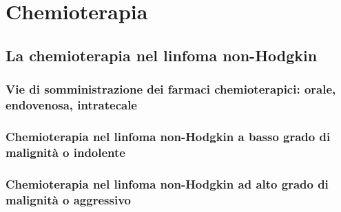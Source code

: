 \chapter{Chemioterapia}

\section{La chemioterapia nel linfoma non-Hodgkin}

\subsection{Vie di somministrazione dei farmaci chemioterapici: orale, endovenosa, intratecale}

\subsection{Chemioterapia nel linfoma non-Hodgkin a basso grado di malignità o indolente}

\subsection{Chemioterapia nel linfoma non-Hodgkin ad alto grado di malignità o aggressivo}